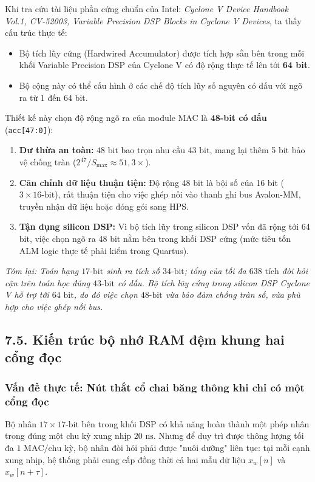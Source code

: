 Khi tra cứu tài liệu phần cứng chuẩn của Intel: \emph{Cyclone V Device Handbook Vol.1, CV-52003, Variable Precision DSP Blocks in Cyclone V Devices}, ta thấy cấu trúc thực tế:
\begin{itemize}[leftmargin=1.5em, itemsep=2pt]
    \item Bộ tích lũy cứng (Hardwired Accumulator) được tích hợp sẵn bên trong mỗi khối Variable Precision DSP của Cyclone V có độ rộng thực tế lên tới \textbf{64 bit}.
    \item Bộ cộng này có thể cấu hình ở các chế độ tích lũy số nguyên có dấu với ngõ ra từ 1 đến 64 bit.
\end{itemize}

Thiết kế này chọn độ rộng ngõ ra của module MAC là \textbf{48-bit có dấu} (\texttt{acc[47:0]}):
\begin{enumerate}[leftmargin=1.5em, itemsep=2pt]
    \item \textbf{Dư thừa an toàn:} $48\text{ bit}$ bao trọn nhu cầu $43\text{ bit}$, mang lại thêm 5 bit bảo vệ chống tràn ($2^{47} / S_{\max} \approx 51{,}3\times$).
    \item \textbf{Căn chỉnh dữ liệu thuận tiện:} Độ rộng 48 bit là bội số của 16 bit ($3 \times 16\text{-bit}$), rất thuận tiện cho việc ghép nối vào thanh ghi bus Avalon-MM, truyền nhận dữ liệu hoặc đóng gói sang HPS.
    \item \textbf{Tận dụng silicon DSP:} Vì bộ tích lũy trong silicon DSP vốn đã rộng tới 64 bit, việc chọn ngõ ra 48 bit nằm bên trong khối DSP cứng (mức tiêu tốn ALM logic thực tế phải kiểm trong Quartus).
\end{enumerate}

\textit{Tóm lại: Toán hạng $17\text{-bit}$ sinh ra tích số $34\text{-bit}$; tổng của tối đa $638\text{ tích}$ đòi hỏi cận trên toán học đúng $43\text{-bit}$ có dấu. Bộ tích lũy cứng trong silicon DSP Cyclone V hỗ trợ tới $64\text{ bit}$, do đó việc chọn $48\text{-bit}$ vừa bảo đảm chống tràn số, vừa phù hợp cho việc ghép nối bus.}


\subsection*{7.5. Kiến trúc bộ nhớ RAM đệm khung hai cổng đọc}

\subsubsection*{Vấn đề thực tế: Nút thắt cổ chai băng thông khi chỉ có một cổng đọc}
Bộ nhân $17 \times 17\text{-bit}$ bên trong khối DSP có khả năng hoàn thành một phép nhân trong đúng một chu kỳ xung nhịp $20\text{ ns}$. Nhưng để duy trì được thông lượng tối đa $1\text{ MAC/chu kỳ}$, bộ nhân đòi hỏi phải được "nuôi dưỡng" liên tục: tại mỗi cạnh xung nhịp, hệ thống phải cung cấp đồng thời cả hai mẫu dữ liệu $x_w[n]$ và $x_w[n+\tau]$.


